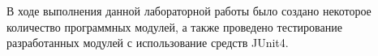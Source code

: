 В ходе выполнения данной лабораторной работы было создано некоторое количество программных модулей, а также проведено тестирование разработанных модулей с использование средств JUnit4.
